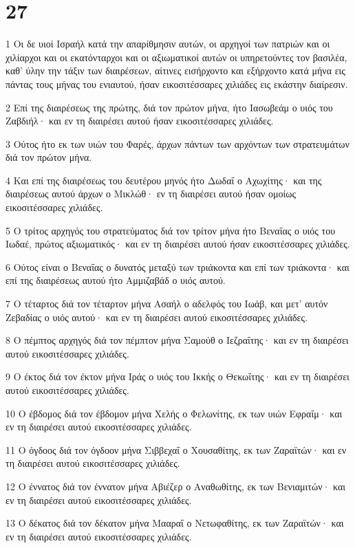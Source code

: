 \chapter{27}

\par 1 Οι δε υιοί Ισραήλ κατά την απαρίθμησιν αυτών, οι αρχηγοί των πατριών και οι χιλίαρχοι και οι εκατόνταρχοι και οι αξιωματικοί αυτών οι υπηρετούντες τον βασιλέα, καθ' ύλην την τάξιν των διαιρέσεων, αίτινες εισήρχοντο και εξήρχοντο κατά μήνα εις πάντας τους μήνας του ενιαυτού, ήσαν εικοσιτέσσαρες χιλιάδες εις εκάστην διαίρεσιν.
\par 2 Επί της διαιρέσεως της πρώτης, διά τον πρώτον μήνα, ήτο Ιασωβεάμ ο υιός του Ζαβδιήλ· και εν τη διαιρέσει αυτού ήσαν εικοσιτέσσαρες χιλιάδες.
\par 3 Ούτος ήτο εκ των υιών του Φαρές, άρχων πάντων των αρχόντων των στρατευμάτων διά τον πρώτον μήνα.
\par 4 Και επί της διαιρέσεως του δευτέρου μηνός ήτο Δωδαΐ ο Αχωχίτης· και της διαιρέσεως αυτού άρχων ο Μικλώθ· εν τη διαιρέσει αυτού ήσαν ομοίως εικοσιτέσσαρες χιλιάδες.
\par 5 Ο τρίτος αρχηγός του στρατεύματος διά τον τρίτον μήνα ήτο Βεναΐας ο υιός του Ιωδαέ, πρώτος αξιωματικός· και εν τη διαιρέσει αυτού ήσαν εικοσιτέσσαρες χιλιάδες.
\par 6 Ούτος είναι ο Βεναΐας ο δυνατός μεταξύ των τριάκοντα και επί των τριάκοντα· και επί της διαιρέσεως αυτού ήτο Αμμιζαβάδ ο υιός αυτού.
\par 7 Ο τέταρτος διά τον τέταρτον μήνα Ασαήλ ο αδελφός του Ιωάβ, και μετ' αυτόν Ζεβαδίας ο υιός αυτού· και εν τη διαιρέσει αυτού εικοσιτέσσαρες χιλιάδες.
\par 8 Ο πέμπτος αρχηγός διά τον πέμπτον μήνα Σαμούθ ο Ιεζραΐτης· και εν τη διαιρέσει αυτού εικοσιτέσσαρες χιλιάδες.
\par 9 Ο έκτος διά τον έκτον μήνα Ιράς ο υιός του Ικκής ο Θεκωΐτης· και εν τη διαιρέσει αυτού εικοσιτέσσαρες χιλιάδες.
\par 10 Ο έβδομος διά τον έβδομον μήνα Χελής ο Φελωνίτης, εκ των υιών Εφραΐμ· και εν τη διαιρέσει αυτού εικοσιτέσσαρες χιλιάδες.
\par 11 Ο όγδοος διά τον όγδοον μήνα Σιββεχαΐ ο Χουσαθίτης, εκ των Ζαραϊτών· και εν τη διαιρέσει αυτού εικοσιτέσσαρες χιλιάδες.
\par 12 Ο έννατος διά τον έννατον μήνα Αβιέζερ ο Αναθωθίτης, εκ των Βενιαμιτών· και εν τη διαιρέσει αυτού εικοσιτέσσαρες χιλιάδες.
\par 13 Ο δέκατος διά τον δέκατον μήνα Μααραΐ ο Νετωφαθίτης, εκ των Ζαραϊτών· και εν τη διαιρέσει αυτού εικοσιτέσσαρες χιλιάδες.
